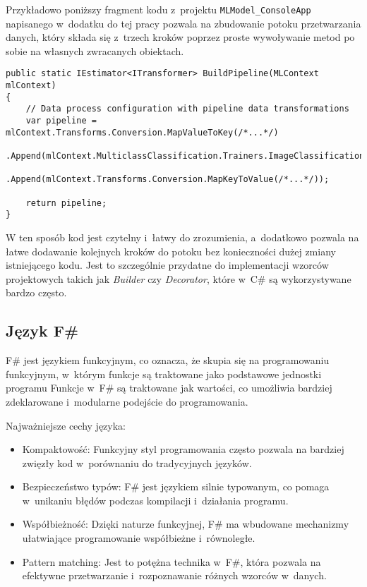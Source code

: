 Przykładowo poniższy fragment kodu z~projektu \lstinline{MLModel_ConsoleApp} napisanego w~dodatku do tej pracy pozwala na zbudowanie potoku przetwarzania danych, który składa się z~trzech kroków poprzez proste wywoływanie metod po sobie na własnych zwracanych obiektach.

\begin{lstlisting}[language={[Sharp]C}]
public static IEstimator<ITransformer> BuildPipeline(MLContext mlContext)
{
    // Data process configuration with pipeline data transformations
    var pipeline = mlContext.Transforms.Conversion.MapValueToKey(/*...*/)
        .Append(mlContext.MulticlassClassification.Trainers.ImageClassification(/*...*/))
        .Append(mlContext.Transforms.Conversion.MapKeyToValue(/*...*/));

    return pipeline;
}
\end{lstlisting}

W ten sposób kod jest czytelny i~łatwy do zrozumienia, a~dodatkowo pozwala na łatwe dodawanie kolejnych kroków do potoku bez konieczności dużej zmiany istniejącego kodu.
Jest to szczególnie przydatne do implementacji wzorców projektowych takich jak \emph{Builder} czy \emph{Decorator}, które w~C\# są wykorzystywane bardzo często.

\subsection{Język F\#}

F\# jest językiem funkcyjnym, co oznacza, że skupia się na programowaniu funkcyjnym, w~którym funkcje są traktowane jako podstawowe jednostki programu
Funkcje w~F\# są traktowane jak wartości, co umożliwia bardziej zdeklarowane i~modularne podejście do programowania.

Najważniejsze cechy języka:

\begin{itemize}

  \item Kompaktowość: Funkcyjny styl programowania często pozwala na bardziej zwięzły kod w~porównaniu do tradycyjnych języków.

  \item Bezpieczeństwo typów: F\# jest językiem silnie typowanym, co pomaga w~unikaniu błędów podczas kompilacji i~działania programu.

  \item Współbieżność: Dzięki naturze funkcyjnej, F\# ma wbudowane mechanizmy ułatwiające programowanie współbieżne i~równoległe.

  \item Pattern matching: Jest to potężna technika w~F\#, która pozwala na efektywne przetwarzanie i~rozpoznawanie różnych wzorców w~danych.

\end{itemize}

